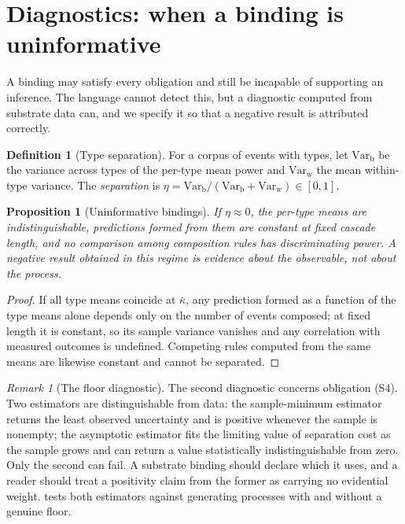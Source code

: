 \documentclass[11pt,a4paper]{article}
\theoremstyle{thmstyle}
\newtheorem{proposition}[theorem]{Proposition}
\theoremstyle{definition}
\newtheorem{definition}[theorem]{Definition}
\theoremstyle{remark}
\newtheorem{remark}[theorem]{Remark}
\newcommand{\kap}{\kappa}
\begin{document}
\section{Diagnostics: when a binding is uninformative}
\label{sec:diagnostics}

A binding may satisfy every obligation and still be incapable of supporting
an inference. The language cannot detect this, but a diagnostic computed
from substrate data can, and we specify it so that a negative result is
attributed correctly.

\begin{definition}[Type separation]
\label{def:separation}
For a corpus of events with types, let $\mathrm{Var}_{\mathrm{b}}$ be the
variance across types of the per-type mean power and
$\mathrm{Var}_{\mathrm{w}}$ the mean within-type variance. The
\emph{separation} is
$\eta=\mathrm{Var}_{\mathrm{b}}/(\mathrm{Var}_{\mathrm{b}}+\mathrm{Var}_{\mathrm{w}})\in[0,1]$.
\end{definition}

\begin{proposition}[Uninformative bindings]
\label{prop:uninformative}
If $\eta\approx0$, the per-type means are indistinguishable, predictions
formed from them are constant at fixed cascade length, and no comparison
among composition rules has discriminating power. A negative result obtained
in this regime is evidence about the observable, not about the process.
\end{proposition}

\begin{proof}
If all type means coincide at $\bar\kap$, any prediction formed as a
function of the type means alone depends only on the number of events
composed; at fixed length it is constant, so its sample variance vanishes
and any correlation with measured outcomes is undefined. Competing rules
computed from the same means are likewise constant and cannot be separated.
\end{proof}

\begin{remark}[The floor diagnostic]
\label{rem:floor-diag}
The second diagnostic concerns obligation (S4). Two estimators are
distinguishable from data: the sample-minimum estimator returns the least
observed uncertainty and is positive whenever the sample is nonempty; the
asymptotic estimator fits the limiting value of separation cost as the
sample grows and can return a value statistically indistinguishable from
zero. Only the second can fail. A substrate binding should declare which it
uses, and a reader should treat a positivity claim from the former as
carrying no evidential weight.  tests both estimators
against generating processes with and without a genuine floor.
\end{remark}
\end{document}
